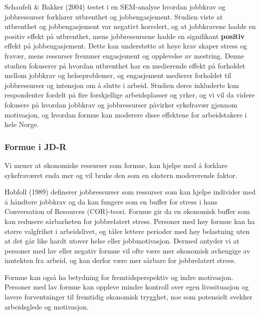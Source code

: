 \documentclass[
  12pt,
  a4paper,
  DIV=11,
  numbers=noendperiod]{scrartcl}
\begin{document}
Schaufeli \& Bakker (2004) testet i en SEM-analyse hvordan jobbkrav og
jobbressurser forklarer utbrenthet og jobbengasjement. Studien viste at
utbrenthet og jobbengasjement var negativt korrelert, og at jobbkravene
hadde en positiv effekt på utbrenthet, mens jobbressursene hadde en
signifikant \textbf{positiv} effekt på jobbengasjement. Dette kan
understøtte at høye krav skaper stress og fravær, mens ressurser fremmer
engasjement og opplevelse av mestring. Denne studien fokuserer på
hvordan utbrenthet har en medierende effekt på forholdet mellom jobbkrav
og helseproblemer, og engasjement medierer forholdet til jobbressurser
og intensjon om å slutte i arbeid. Studien deres inkluderte kun
respondenter fordelt på fire forskjellige arbeidsplasser og yrker, og vi
vil da videre fokusere på hvordan jobbkrav og jobbressurser påvirker
sykefravær gjennom motivasjon, og hvordan formue kan moderere disse
effektene for arbeidstakere i hele Norge.

\subsubsection{Formue i JD-R}\label{sec-formue-jdr}

Vi mener at økonomiske ressurser som formue, kan hjelpe med å forklare
sykefraværet enda mer og vil bruke den som en ekstern modererende
faktor.

Hobfoll (1989) definerer jobbressurser som ressurser som kan hjelpe
individer med å håndtere jobbkrav og da kan fungere som en buffer for
stress i hans Conversation of Resources (COR)-teori. Formue gir da en
økonomisk buffer som kan redusere sårbarheten for jobbrelatert stress.
Personer med høy formue kan ha større valgfrihet i arbeidslivet, og
tåler lettere perioder med høy belastning uten at det går like hardt
utover helse eller jobbmotivasjon. Dermed antyder vi at personer med lav
eller negativ formue vil ofte være mer økonomisk avhengige av inntekten
fra arbeid, og kan derfor være mer sårbare for jobbrelatert stress.

Formue kan også ha betydning for fremtidsperspektiv og indre motivasjon.
Personer med lav formue kan oppleve mindre kontroll over egen
livssituasjon og lavere forventninger til fremtidig økonomisk trygghet,
noe som potensielt svekker arbeidsglede og motivasjon.
\end{document}
